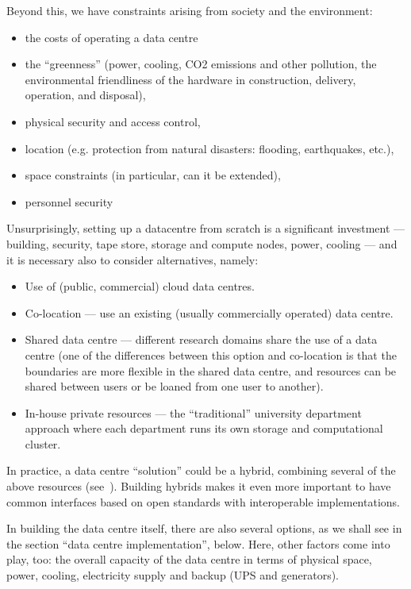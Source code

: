 Beyond this, we have constraints arising from society and the environment:
\begin{itemize}
\item the costs of operating a data centre %
\item the ``greenness'' (power, cooling, CO2 emissions and other pollution, the environmental friendliness of the hardware in
construction, delivery, operation, and disposal),
\item physical security and access control,
\item location (e.g. protection from natural disasters: flooding, earthquakes, etc.),
\item space constraints (in particular, can it be extended),
\item personnel security
\end{itemize}

Unsurprisingly, setting up a datacentre from scratch is a significant investment --- building, security, tape store,
storage and compute nodes, power, cooling --- and it is necessary also to consider alternatives, namely:
\begin{itemize}
\item Use of (public, commercial) cloud data centres.
\item Co-location --- use an existing (usually commercially operated) data centre.
\item Shared data centre --- different research domains share the use of a data centre (one of the differences between
  this option and co-location is that the boundaries are more flexible in the shared data centre, and resources can be
  shared between users or be loaned from one user to another).
\item In-house private resources --- the ``traditional'' university department approach where each department runs its own
  storage and computational cluster.
\end{itemize}

In practice, a data centre ``solution'' could be a hybrid, combining several of
the above resources (see~).  Building hybrids makes it even more
important to have common interfaces based on open standards with interoperable
implementations.

In building the data centre itself, there are also several options, as we shall
see in the section ``data centre implementation'', below.  Here, other factors
come into play, too: the overall capacity of the data centre in terms of
physical space, power, cooling, electricity supply and backup (UPS and
generators).

